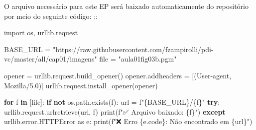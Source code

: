 \documentclass[
  portuguese,
  letterpaper,
  openany,
  oneside,
  12pt,
  a4paper]{book}
\newenvironment{Shaded}{\begin{snugshade}}{\end{snugshade}}
\newcommand{\BuiltInTok}[1]{\textcolor[rgb]{0.00,0.23,0.31}{#1}}
\newcommand{\ControlFlowTok}[1]{\textcolor[rgb]{0.00,0.23,0.31}{\textbf{#1}}}
\newcommand{\ImportTok}[1]{\textcolor[rgb]{0.00,0.46,0.62}{#1}}
\newcommand{\KeywordTok}[1]{\textcolor[rgb]{0.00,0.23,0.31}{\textbf{#1}}}
\newcommand{\NormalTok}[1]{\textcolor[rgb]{0.00,0.23,0.31}{#1}}
\newcommand{\OperatorTok}[1]{\textcolor[rgb]{0.37,0.37,0.37}{#1}}
\newcommand{\SpecialCharTok}[1]{\textcolor[rgb]{0.37,0.37,0.37}{#1}}
\newcommand{\SpecialStringTok}[1]{\textcolor[rgb]{0.13,0.47,0.30}{#1}}
\newcommand{\StringTok}[1]{\textcolor[rgb]{0.13,0.47,0.30}{#1}}
\begin{document}
\begin{tcolorbox}[enhanced jigsaw, colframe=quarto-callout-note-color-frame, opacitybacktitle=0.6, coltitle=black, rightrule=.15mm, bottomrule=.15mm, arc=.35mm, toprule=.15mm, breakable, opacityback=0, colbacktitle=quarto-callout-note-color!10!white, left=2mm, title=\textcolor{quarto-callout-note-color}{\faInfo}\hspace{0.5em}{Nota}, bottomtitle=1mm, toptitle=1mm, titlerule=0mm, leftrule=.75mm, colback=white]

O arquivo necessário para este EP será baixado automaticamente do
repositório por meio do seguinte código: ::

\begin{Shaded}
\begin{Highlighting}[]
\ImportTok{import}\NormalTok{ os, urllib.request}

\NormalTok{BASE\_URL }\OperatorTok{=} \StringTok{"https://raw.githubusercontent.com/fzampirolli/pdi{-}vc/master/all/cap01/imagens"}
\BuiltInTok{file} \OperatorTok{=} \StringTok{"aula01fig03b.pgm"}

\NormalTok{opener }\OperatorTok{=}\NormalTok{ urllib.request.build\_opener()}
\NormalTok{opener.addheaders }\OperatorTok{=}\NormalTok{ [(}\StringTok{\textquotesingle{}User{-}agent\textquotesingle{}}\NormalTok{, }\StringTok{\textquotesingle{}Mozilla/5.0\textquotesingle{}}\NormalTok{)]}
\NormalTok{urllib.request.install\_opener(opener)}

\ControlFlowTok{for}\NormalTok{ f }\KeywordTok{in}\NormalTok{ [}\BuiltInTok{file}\NormalTok{]:}
    \ControlFlowTok{if} \KeywordTok{not}\NormalTok{ os.path.exists(f):}
\NormalTok{        url }\OperatorTok{=} \SpecialStringTok{f"}\SpecialCharTok{\{}\NormalTok{BASE\_URL}\SpecialCharTok{\}}\SpecialStringTok{/}\SpecialCharTok{\{}\NormalTok{f}\SpecialCharTok{\}}\SpecialStringTok{"}
        \ControlFlowTok{try}\NormalTok{:}
\NormalTok{            urllib.request.urlretrieve(url, f)}
            \BuiltInTok{print}\NormalTok{(}\SpecialStringTok{f"✅ Arquivo baixado: }\SpecialCharTok{\{}\NormalTok{f}\SpecialCharTok{\}}\SpecialStringTok{"}\NormalTok{)}
        \ControlFlowTok{except}\NormalTok{ urllib.error.HTTPError }\ImportTok{as}\NormalTok{ e:}
            \BuiltInTok{print}\NormalTok{(}\SpecialStringTok{f"❌ Erro }\SpecialCharTok{\{}\NormalTok{e}\SpecialCharTok{.}\NormalTok{code}\SpecialCharTok{\}}\SpecialStringTok{: Não encontrado em }\SpecialCharTok{\{}\NormalTok{url}\SpecialCharTok{\}}\SpecialStringTok{"}\NormalTok{)}
\end{Highlighting}
\end{Shaded}


\end{tcolorbox}
\end{document}
